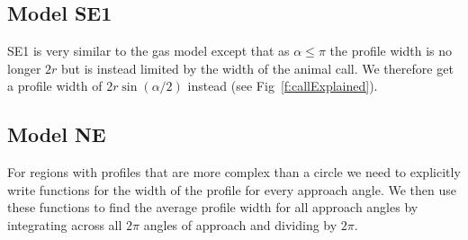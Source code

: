 \subsection{Model SE1} \label{SE1}

SE1 is very similar to the gas model except that as $\alpha \le \pi$ the profile width is no longer $2r$ but is instead limited by the width of the animal call. We therefore get a profile width of $2r\sin(\alpha/2)$ instead (see Fig~\ref{f:callExplained}).



\subsection{Model NE} \label{NE}

For regions with profiles that are more complex than a circle we need to explicitly write functions for the width of the profile for every approach angle. We then use these functions to find the average profile width for all approach angles by integrating across all $2\pi$ angles of approach and dividing by $2\pi$. 



